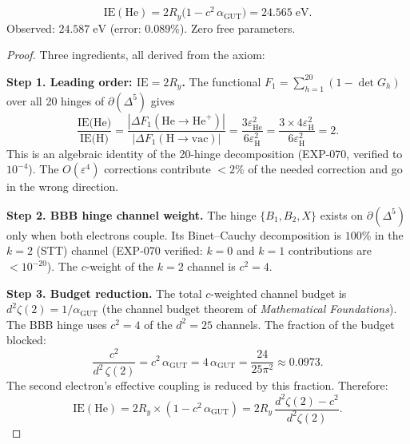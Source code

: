 \begin{theorem}
\label{thm:helium_IE}
\begin{equation}
\boxed{\text{IE}(\text{He}) = 2R_y\bigl(1 - c^2\,\alpha_\text{GUT}\bigr) = 24.565\;\text{eV}.}
\end{equation}
Observed: $24.587\;\text{eV}$ (error: $0.089\%$).  Zero free parameters.
\end{theorem}
\begin{proof}
Three ingredients, all derived from the axiom:

\textbf{Step 1.  Leading order: $\mathrm{IE} = 2R_y$.}
The functional $F_1 = \sum_{h=1}^{20}(1-\det G_h)$ over all 20 hinges of $\partial(\Delta^5)$ gives
\begin{equation}
\frac{\text{IE(He)}}{\text{IE(H)}} = \frac{|\Delta F_1(\text{He}\to\text{He}^+)|}{|\Delta F_1(\text{H}\to\text{vac})|}
= \frac{3\varepsilon_\text{He}^2}{6\varepsilon_\text{H}^2} = \frac{3 \times 4\varepsilon_\text{H}^2}{6\varepsilon_\text{H}^2} = 2.
\end{equation}
This is an algebraic identity of the 20-hinge decomposition (EXP-070, verified to $10^{-4}$).  The $O(\varepsilon^4)$ corrections contribute $<2\%$ of the needed correction and go in the wrong direction.

\textbf{Step 2.  BBB hinge channel weight.}
The hinge $\{B_1, B_2, X\}$ exists on $\partial(\Delta^5)$ only when both electrons couple.  Its Binet--Cauchy decomposition is $100\%$ in the $k=2$ (STT) channel (EXP-070 verified: $k=0$ and $k=1$ contributions are $< 10^{-20}$).  The $c$-weight of the $k=2$ channel is $c^2 = 4$.

\textbf{Step 3.  Budget reduction.}
The total $c$-weighted channel budget is $d^2\zeta(2) = 1/\alpha_\text{GUT}$ (the channel budget theorem of \textit{Mathematical Foundations}).
The BBB hinge uses $c^2 = 4$ of the $d^2 = 25$ channels.  The fraction of the budget blocked:
\begin{equation}
\frac{c^2}{d^2\,\zeta(2)} = c^2\,\alpha_\text{GUT} = 4\,\alpha_\text{GUT} = \frac{24}{25\pi^2} \approx 0.0973.
\end{equation}
The second electron's effective coupling is reduced by this fraction.  Therefore:
\begin{equation}
\text{IE}(\text{He}) = 2R_y \times \left(1 - c^2\,\alpha_\text{GUT}\right) = 2R_y\,\frac{d^2\zeta(2) - c^2}{d^2\zeta(2)}.
\end{equation}
\end{proof}

